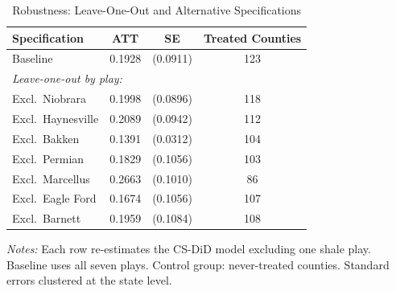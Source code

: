 \begin{table}[H]
\centering
\caption{Robustness: Leave-One-Out and Alternative Specifications}
\begin{threeparttable}
\begin{tabular}{lccc}
\toprule
Specification & ATT & SE & Treated Counties \\
\midrule
Baseline & 0.1928 & (0.0911) & 123 \\
\midrule
\multicolumn{4}{l}{\textit{Leave-one-out by play:}} \\
\quad Excl.\ Niobrara & 0.1998 & (0.0896) & 118 \\
\quad Excl.\ Haynesville & 0.2089 & (0.0942) & 112 \\
\quad Excl.\ Bakken & 0.1391 & (0.0312) & 104 \\
\quad Excl.\ Permian & 0.1829 & (0.1056) & 103 \\
\quad Excl.\ Marcellus & 0.2663 & (0.1010) & 86 \\
\quad Excl.\ Eagle Ford & 0.1674 & (0.1056) & 107 \\
\quad Excl.\ Barnett & 0.1959 & (0.1084) & 108 \\
\bottomrule
\end{tabular}
\begin{tablenotes}[flushleft]
\small
\item \textit{Notes:} Each row re-estimates the CS-DiD model excluding one shale play. Baseline uses all seven plays. Control group: never-treated counties. Standard errors clustered at the state level.
\end{tablenotes}
\end{threeparttable}
\label{tab:robust}
\end{table}
